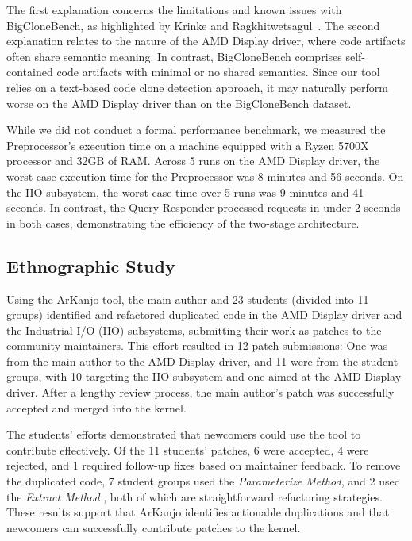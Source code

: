 \documentclass[conference]{IEEEtran}
\begin{document}
The first explanation concerns the limitations and known issues with BigCloneBench, as
highlighted by Krinke and Ragkhitwetsagul~\cite{bigfail}. The
second explanation relates to the nature of the AMD Display driver, where code artifacts
often share semantic meaning. In contrast, BigCloneBench comprises self-contained code
artifacts with minimal or no shared semantics. Since our tool relies on a text-based code clone
detection approach, it may naturally perform worse on the AMD Display driver than on the
BigCloneBench dataset.

While we did not conduct a formal performance benchmark, we measured the Preprocessor's execution 
time on a machine equipped with a Ryzen 5700X processor and 32GB of RAM. Across 5 runs on the 
AMD Display driver, the worst-case execution time for the Preprocessor was 8 minutes and 56 seconds. 
On the IIO subsystem, the worst-case time over 5 runs was 9 minutes and 41 seconds. 
In contrast, the Query Responder processed requests in under 2 seconds in both cases, 
demonstrating the efficiency of the two-stage architecture.

\subsection{Ethnographic Study}

Using the ArKanjo tool, the main author and 23 students (divided into 11 groups) identified and refactored 
duplicated code in the AMD Display driver and the Industrial I/O (IIO) subsystems, submitting their work 
as patches to the community maintainers. This effort resulted in 12 patch submissions: 
One was from the main author to the AMD Display driver, and 11 were from the student groups, with 10 targeting 
the IIO subsystem and one aimed at the AMD Display driver. After a lengthy review process, the main author's patch 
was successfully accepted and merged into the kernel.

The students' efforts demonstrated that newcomers could use the tool to contribute effectively. 
Of the 11 students' patches, 6 were accepted, 4 were rejected, and 1 required follow-up 
fixes based on maintainer feedback. To remove the duplicated code, 7 student groups used the 
\textit{Parameterize Method}, and 2 used the \textit{Extract Method} \cite{refactorbook}, both of which are 
straightforward refactoring strategies. These results support that ArKanjo identifies 
actionable duplications and that newcomers can successfully contribute patches to the kernel.
\end{document}
